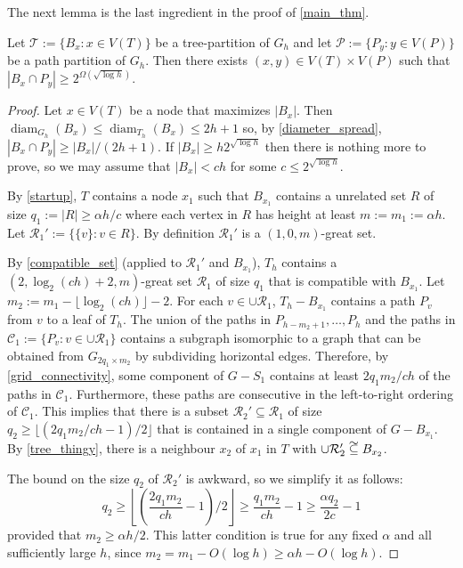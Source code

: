 \documentclass{patmorin}
\DeclareMathOperator{\diam}{diam}
\newcommand\subsetcong{\mathrel{\text{%
    \setbox0\hbox{$\subseteq$}%
    \rlap{\hbox to \wd0{\hss\hss\hss\raisebox{1.5\height}{$\sim$}\hss}}\box0
}}}
\renewcommand{\le}{\leqslant}
\renewcommand{\ge}{\geqslant}
\begin{document}
The next lemma is the last ingredient in the proof of \cref{main_thm}.
\begin{lem}\label{big_lemma}
  Let $\mathcal{T}:=\{B_x:x\in V(T)\}$ be a tree-partition of $G_h$ and let $\mathcal{P}:=\{P_y:y\in V(P)\}$ be a path partition of $G_h$.  Then there exists $(x,y)\in V(T)\times V(P)$ such that $|B_x\cap P_y| \ge 2^{\Omega(\sqrt{\log h})}$.
\end{lem}

\begin{proof}
  Let $x\in V(T)$ be a node that maximizes $|B_x|$.  Then $\diam_{G_h}(B_x)\le\diam_{T_h}(B_x) \le 2h+1$ so, by \cref{diameter_spread}, $|B_x\cap P_y|\ge |B_x|/(2h+1)$.  If $|B_x|\ge h2^{\sqrt{\log h}}$ then there is nothing more to prove, so we may assume that $|B_x| < ch$ for some $c\le 2^{\sqrt{\log h}}$.

  By \cref{startup}, $T$ contains a node $x_1$ such that $B_{x_1}$ contains a unrelated set $R$ of size $q_1:=|R|\ge \alpha h/c$ where each vertex in $R$ has height at least $m:=m_1:=\alpha h$.  Let  $\mathcal{R}_1':=\{\{v\}:v\in R\}$.  By definition $\mathcal{R}_1'$ is a $(1,0,m)$-great set.

  By \cref{compatible_set} (applied to $\mathcal{R}_1'$ and $B_{x_1}$), $T_h$ contains a $(2,\log_2(ch)+2,m)$-great set $\mathcal{R}_1$ of size $q_1$ that is compatible with $B_{x_1}$.  Let $m_2:=m_1-\lfloor\log_2(ch)\rfloor -2$.  For each $v\in\cup\mathcal{R}_1$, $T_h-B_{x_1}$ contains a path $P_v$ from $v$ to a leaf of $T_h$.  The union of the paths in $P_{h-m_2+1},\ldots,P_{h}$ and the paths in $\mathcal{C}_1:=\{P_v:v\in\cup\mathcal{R}_1\}$ contains a subgraph isomorphic to a graph that can be obtained from $G_{2q_1\times m_2}$ by subdividing horizontal edges.  Therefore, by \cref{grid_connectivity}, some component of $G-S_1$ contains at least $2q_1m_2/ch$ of the paths in $\mathcal{C}_1$.  Furthermore, these paths are consecutive in the left-to-right ordering of $\mathcal{C}_1$.  This implies that there is a subset $\mathcal{R}_2'\subseteq \mathcal{R}_1$ of size $q_2\ge \lfloor(2q_1m_2/ch-1)/2\rfloor$ that is contained in a single component of $G-B_{x_1}$. By \cref{tree_thingy}, there is a neighbour $x_2$ of $x_1$ in $T$ with $\cup\mathcal{R}_2'\subsetcong B_{x_2}$.

  The bound on the size $q_2$ of $\mathcal{R}_2'$ is awkward, so we simplify it as follows:
  \[
    q_2 \ge \left\lfloor\left(\frac{2q_1m_2}{ch} - 1\right) /2 \right\rfloor
        \ge \frac{q_1m_2}{ch} - 1 \ge \frac{\alpha q_2}{2c} - 1
  \]
  provided that $m_2 \ge\alpha h/2$.  This latter condition is true for any fixed $\alpha$ and all sufficiently large $h$, since $m_2 = m_1 - O(\log h) \ge \alpha h - O(\log h)$.


\end{proof}
\end{document}
